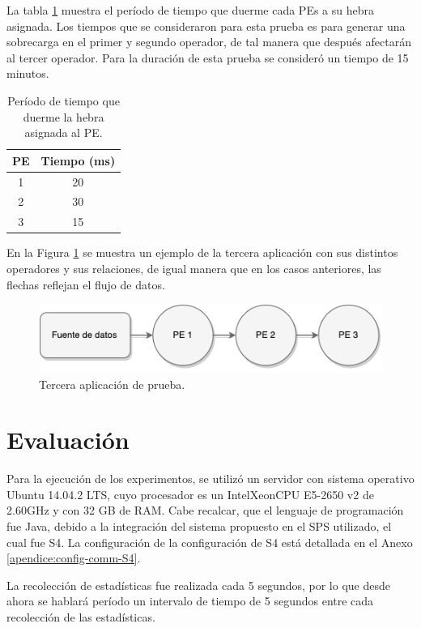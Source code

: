 La tabla \ref{tab:app3-time} muestra el período de tiempo que duerme cada PEs a su hebra asignada. Los tiempos que se consideraron para esta prueba es para generar una sobrecarga en el primer y segundo operador, de tal manera que después afectarán al tercer operador. Para la duración de esta prueba se consideró un tiempo de 15 minutos.

\begin{table}[!ht]
\centering
\begin{tabular}{| c | c |}
\hline
PE & Tiempo (ms) \\ \hline
1 & 20 \\
2 & 30 \\
3 & 15 \\\hline
\end{tabular}
\caption{Período de tiempo que duerme la hebra asignada al PE.}
\label{tab:app3-time}
\end{table}

En la Figura \ref{fig:terceraAplicacion} se muestra un ejemplo de la tercera aplicación con sus distintos operadores y sus relaciones, de igual manera que en los casos anteriores, las flechas reflejan el flujo de datos.

\begin{figure}[!hb]
	\centering
		\includegraphics[scale=0.75]{images/App3.pdf}
	\caption{Tercera aplicación de prueba.}
	\label{fig:terceraAplicacion}
\end{figure}

\section{Evaluación}

Para la ejecución de los experimentos, se utilizó un servidor con sistema operativo Ubuntu 14.04.2 LTS, cuyo procesador es un Intel\textregistered Xeon\textregistered CPU E5-2650 v2 de 2.60GHz y con 32 GB de RAM. Cabe recalcar, que el lenguaje de programación fue Java, debido a la integración del sistema propuesto en el SPS utilizado, el cual fue S4. La configuración de la configuración de S4 está detallada en el Anexo \ref{apendice:config-comm-S4}.

La recolección de estadísticas fue realizada cada 5 segundos, por lo que desde ahora se hablará período un intervalo de tiempo de 5 segundos entre cada recolección de las estadísticas.

